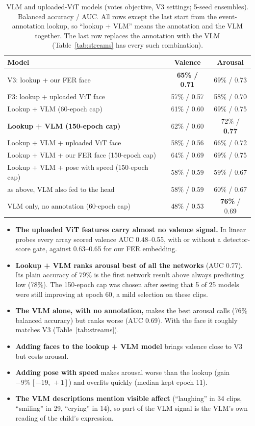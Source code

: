 \documentclass[11pt]{article}
\newcommand{\best}[1]{\textbf{#1}}
\newcommand{\ci}[2]{\,[#1,\,#2]}
\begin{document}
\begin{table}[h]
\centering
\caption{VLM and uploaded-ViT models (votes objective, V3 settings; 5-seed ensembles). Balanced accuracy / AUC. All rows except the last start from the event-annotation lookup, so ``lookup + VLM'' means the annotation and the VLM together. The last row replaces the annotation with the VLM (Table~\ref{tab:streams} has every such combination).}
\label{tab:vlm}
\begin{tabular}{lcc}
\toprule
Model & Valence & Arousal \\
\midrule
V3: lookup + our FER face & \best{65\% / 0.71} & 69\% / 0.73 \\
F3: lookup + uploaded ViT face & 57\% / 0.57 & 58\% / 0.70 \\
Lookup + VLM (60-epoch cap) & 61\% / 0.60 & 69\% / 0.75 \\
\best{Lookup + VLM (150-epoch cap)} & 62\% / 0.60 & 72\% / \best{0.77} \\
Lookup + VLM + uploaded ViT face & 58\% / 0.56 & 66\% / 0.72 \\
Lookup + VLM + our FER face (150-epoch cap) & 64\% / 0.69 & 69\% / 0.75 \\
Lookup + VLM + pose with speed (150-epoch cap) & 58\% / 0.59 & 59\% / 0.67 \\
\quad as above, VLM also fed to the head & 58\% / 0.59 & 60\% / 0.67 \\
\midrule
VLM only, no annotation (60-epoch cap) & 48\% / 0.53 & \best{76\%} / 0.69 \\
\bottomrule
\end{tabular}
\end{table}

\begin{itemize}
  \item \textbf{The uploaded ViT features carry almost no valence signal.} In linear probes every array scored valence AUC 0.48--0.55, with or without a detector-score gate, against 0.63--0.65 for our FER embedding.
  \item \textbf{Lookup + VLM ranks arousal best of all the networks} (AUC 0.77). Its plain accuracy of 79\% is the first network result above always predicting low (78\%). The 150-epoch cap was chosen after seeing that 5 of 25 models were still improving at epoch 60, a mild selection on these clips.
  \item \textbf{The VLM alone, with no annotation,} makes the best arousal calls (76\% balanced accuracy) but ranks worse (AUC 0.69). With the face it roughly matches V3 (Table~\ref{tab:streams}).
  \item \textbf{Adding faces to the lookup + VLM model} brings valence close to V3 but costs arousal.
  \item \textbf{Adding pose with speed} makes arousal worse than the lookup (gain $-9\%\ci{-19}{+1}$) and overfits quickly (median kept epoch 11).
  \item \textbf{The VLM descriptions mention visible affect} (``laughing'' in 34 clips, ``smiling'' in 29, ``crying'' in 14), so part of the VLM signal is the VLM's own reading of the child's expression.
\end{itemize}
\end{document}
